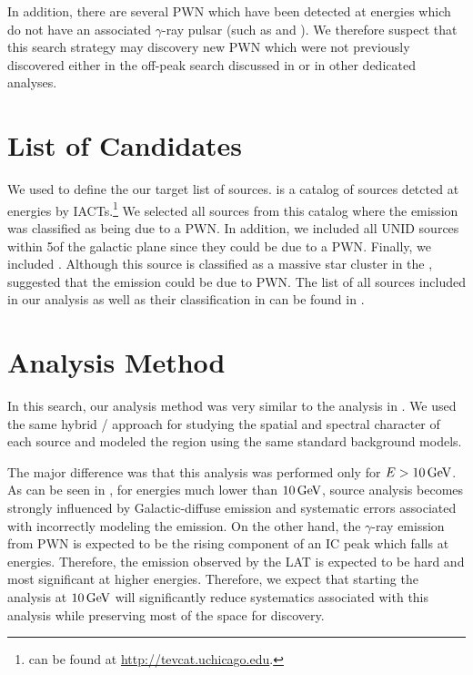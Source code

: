 In addition, there are several \ac{PWN} which have been detected at \tev
energies which do not have an associated $\gamma$-ray pulsar (such as
 and ).  We therefore suspect that this search
strategy may discovery new \ac{PWN} which were not previously discovered
either in the off-peak search discussed in  or in other
dedicated analyses.

\section{List of \tev {} Candidates}



We used \tevcat to define the our target list of \tev sources.
\tevcat is a catalog of sources detcted at
\tev energies by \acp{IACT}.\footnote{\tevcat can be found at
\url{http://tevcat.uchicago.edu}.}  We selected all sources from
this catalog where the emission was classified as being due to a
\ac{PWN}. In addition, we included all \ac{UNID} sources within
5\degree of the galactic plane since they could be due to a \ac{PWN}.  Finally,
we included . Although this source is classified as a massive
star cluster in the \tevcat, 
\cite{de-naurois_2013a_galactic-h.e.s.s.}
suggested that the emission could be due to \ac{PWN}. The list of all sources
included in our analysis as well as their classification in \tevcat can
be found in .

\section{Analysis Method}

In this search, our analysis method was very similar to the analysis
in . We used the same hybrid \pointlike/\gtlike
approach for studying the spatial and spectral character of each source
and modeled the region using the same standard background models.

The major difference was that this analysis
was performed only for $E>10\,\text{GeV}$.  As can be seen in
, for energies much lower than $10\,\text{GeV}$,
source analysis becomes strongly influenced by Galactic-diffuse
emission and systematic errors associated with incorrectly modeling
the emission. On the other hand, the $\gamma$-ray emission from \ac{PWN}
is expected to be the rising component of an \ac{IC} peak which falls
at \tev energies. Therefore, the emission observed by the \ac{LAT} is
expected to be hard and most significant at higher energies. Therefore,
we expect that starting the analysis  at $10\,\text{GeV}$ will
significantly reduce systematics associated with this analysis while
preserving most of the space for discovery.

